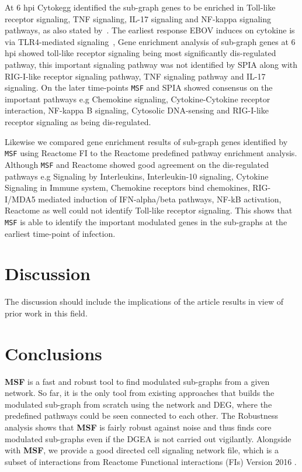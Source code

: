 \documentclass[10pt,a4paper,twocolumn]{article}
\begin{document}
At 6 hpi Cytokegg identified the sub-graph genes to be enriched in
Toll-like receptor signaling, TNF signaling, IL-17 signaling and
NF-kappa signaling pathways, as also stated by~\cite{Olejnik}. The
earliest response EBOV induces on cytokine is via TLR4-mediated
signaling~\cite{Olejnik}, Gene enrichment analysis of sub-graph genes
at 6 hpi showed toll-like receptor signaling being most significantly
dis-regulated pathway, this important signaling pathway was not
identified by SPIA along with RIG-I-like receptor signaling pathway,
TNF signaling pathway and IL-17 signaling. On the later time-points \texttt{MSF} and SPIA showed
consensus on the important pathways e.g Chemokine signaling,
Cytokine-Cytokine receptor interaction, NF-kappa B signaling,
Cytosolic DNA-sensing and RIG-I-like receptor signaling as being
dis-regulated.

Likewise we compared gene enrichment results of sub-graph genes
identified by \texttt{MSF} using Reactome FI to the Reactome
predefined pathway enrichment analysis. Although \texttt{MSF} and
Reactome showed good agreement on the dis-regulated pathways e.g
Signaling by Interleukins, Interleukin-10 signaling, Cytokine
Signaling in Immune system, Chemokine receptors bind chemokines,
RIG-I/MDA5 mediated induction of IFN-alpha/beta pathways, NF-kB
activation, Reactome as well could not identify Toll-like receptor
signaling. This shows that
\texttt{MSF} is able to identify the important modulated genes in the
sub-graphs at the earliest time-point of infection.


\section*{Discussion}

The discussion should include the implications of the article results
in view of prior work in this field.

\section*{Conclusions}

\textbf{MSF} is a fast and robust tool to find modulated sub-graphs
from a given network. So far, it is the only tool from existing
approaches that builds the modulated sub-graph from scratch using the
network and DEG, where the predefined pathways could be seen connected
to each other. The Robustness analysis shows that \textbf{MSF} is
fairly robust against noise and thus finds core modulated sub-graphs
even if the DGEA is not carried out vigilantly. Alongside with
\textbf{MSF}, we provide a good directed cell signaling network file,
which is a subset of interactions from Reactome Functional
interactions (FIs) Version 2016 .
\end{document}
